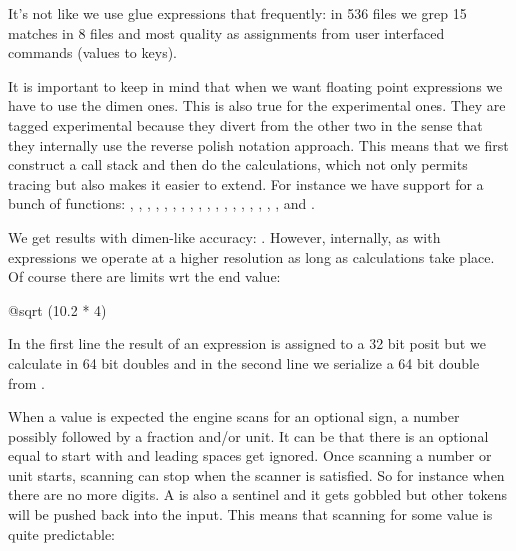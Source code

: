 It's not like we use glue expressions that frequently: in 536 files we grep 15
matches in 8 files and most quality as  assignments from user
interfaced commands (values to keys).

\stopsectionlevel

\startsectionlevel[title={\type {\...experimental}}]

It is important to keep in mind that when we want floating point expressions we
have to use the dimen ones. This is also true for the experimental ones. They are
tagged experimental because they divert from the other two in the sense that they
internally use the reverse polish notation approach. This means that we first
construct a call stack and then do the calculations, which not only permits
tracing but also makes it easier to extend. For instance we have support for a
bunch of functions: , , , , ,
, , , , , ,
, , , , , ,
,  and .

\startbuffer
\thewithoutunit{}
\thewithoutunit{}
\thewithoutunit{}
\stopbuffer

\typebuffer[option=TEX]

We get results with dimen-like accuracy: \inlinebuffer. However, internally, as
with expressions we operate at a higher resolution as long as calculations take
place. Of course there are limits wrt the end value:

\startbuffer
\scratchfloat\dimexperimental @sqrt (10.2 * 4) \relax \the\scratchfloat
{}
\stopbuffer

\typebuffer[option=TEX]

In the first line the result of an expression is assigned to a 32 bit posit but
we calculate in 64 bit doubles and in the second line we serialize a 64 bit
double from \LUA.

\startlines
\getbuffer
\stoplines


\stopsectionlevel

\startsectionlevel[title={Assignments}]

When a value is expected the engine scans for an optional sign, a number possibly
followed by a fraction and/or unit. It can be that there is an optional equal to
start with and leading spaces get ignored. Once scanning a number or unit starts,
scanning can stop when the scanner is satisfied. So for instance when there are
no more digits. A \type {\relax} is also a sentinel and it gets gobbled but other
tokens will be pushed back into the input. This means that scanning for some
value is quite predictable:

